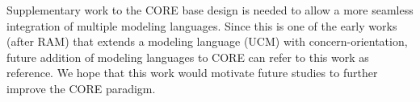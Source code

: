 Supplementary work to the CORE base design is needed to allow a more seamless integration of multiple modeling languages. Since this is one of the early works (after RAM) that extends a modeling language (UCM) with concern-orientation, future addition of modeling languages to CORE can refer to this work as reference. We hope that this work would motivate future studies to further improve the CORE paradigm.
